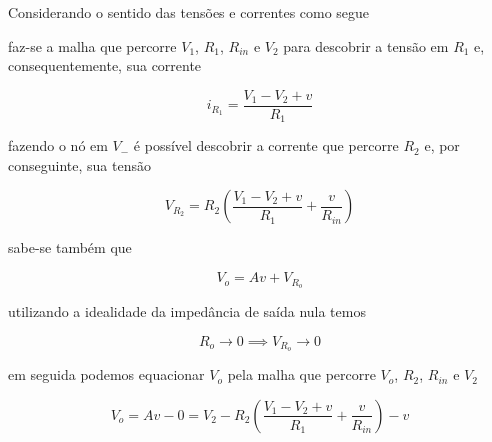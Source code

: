 \documentclass{article}
\numberwithin{equation}{section}
\let\dfr\dfrac
\begin{document}
\noindent Considerando o sentido das tensões e correntes como segue

\begin{center}
\end{center}

\noindent faz-se a malha que percorre $V_1$, $R_1$, $R_{in}$ e $V_2$ para descobrir a tensão em $R_1$ e, consequentemente, sua corrente

\begin{equation*}
    i_{R_1} = \dfr{V_1-V_2+v}{R_1}
\end{equation*}

\noindent fazendo o nó em $V_-$ é possível descobrir a corrente que percorre $R_2$ e, por conseguinte, sua tensão

\begin{equation*}
   V_{R_2} = R_2\left(\dfr{V_1-V_2+v}{R_1}+\dfr{v}{R_{in}}\right)
\end{equation*}

\noindent sabe-se também que

\begin{equation*}
    V_o = Av + V_{R_o}
\end{equation*}

\noindent utilizando a idealidade da impedância de saída nula temos

\begin{equation*}
    R_o \to 0 \implies V_{R_o} \to 0
\end{equation*}

\noindent em seguida podemos equacionar $V_o$ pela malha que percorre $V_o$, $R_2$, $R_{in}$ e $V_2$

\begin{equation*}
    V_o = Av - 0 = V_2 - R_2\left(\dfr{V_1-V_2+v}{R_1}+\dfr{v}{R_{in}}\right) - v
\end{equation*}
\end{document}
